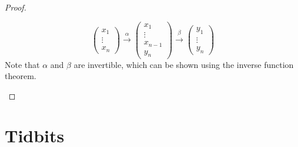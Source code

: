 \documentclass{article}
\numberwithin{equation}{section}
\begin{document}
\begin{proof}
\begin{enumerate}
\begin{equation}
\begin{pmatrix}
                 x_1 \\ \vdots \\ x_n
             \end{pmatrix}
            \xrightarrow[]{\alpha}
            \begin{pmatrix}
                x_1 \\ \vdots \\ x_{n-1} \\ y_n
            \end{pmatrix}
            \xrightarrow[]{\beta}
            \begin{pmatrix}
                y_1 \\ \vdots \\ y_{n}
            \end{pmatrix}
         \end{equation}
         Note that $\alpha$ and $\beta$ are invertible, which can be shown using the inverse function theorem.
    \end{enumerate}
\end{proof}
\section{Tidbits}
\end{document}
